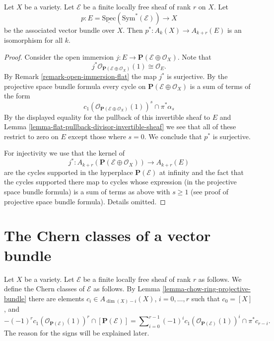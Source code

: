 \begin{lemma}
Let $X$ be a variety.
Let $\mathcal{E}$ be a finite locally free sheaf of rank $r$ on $X$.
Let
$$
p :
E = \underline{\text{Spec}}(\text{Sym}^*(\mathcal{E}))
\longrightarrow
X
$$
be the associated vector bundle over $X$.
Then $p^* : A_k(X) \to A_{k + r}(E)$ is an isomorphism for all $k$.
\end{lemma}

\begin{proof}
Consider the open immersion
$j : E \to \mathbf{P}(\mathcal{E} \oplus \mathcal{O}_X)$.
Note that 
$$
j^*\mathcal{O}_{\mathbf{P}(\mathcal{E} \oplus \mathcal{O}_X)}(1)
\cong \mathcal{O}_E.
$$
By Remark \ref{remark-open-immersion-flat} the map
$j^*$ is surjective. By the projective space bundle formula every
cycle on $\mathbf{P}(\mathcal{E} \oplus \mathcal{O}_X)$ is a
sum of terms of the form 
$$
c_1(\mathcal{O}_{\mathbf{P}(\mathcal{E} \oplus \mathcal{O}_X)}(1))^s
\cap
\pi^*\alpha_s
$$
By the displayed equality for the pullback of this invertible sheaf
to $E$ and Lemma \ref{lemma-flat-pullback-divisor-invertible-sheaf}
we see that all of these restrict to zero on $E$ except those where
$s = 0$. We conclude that $p^*$ is surjective.

\medskip\noindent
For injectivity we use that the kernel of
$$
j^* :
A_{k + r}(\mathbf{P}(\mathcal{E} \oplus \mathcal{O}_X))
\longrightarrow
A_{k + r}(E)
$$
are the cycles supported in the hyperplace $\mathbf{P}(\mathcal{E})$
at infinity and the fact that the cycles supported there map to cycles
whose expression (in the projective space bundle formula) is a sum of
terms as above with $s \geq 1$ (see proof of projective space bundle
formula). Details omitted.
\end{proof}








\section{The Chern classes of a vector bundle}
\label{section-chern-classes-vector-bundles}

\noindent
Let $X$ be a variety. Let $\mathcal{E}$ be a finite locally free sheaf
of rank $r$ as follows. We define the Chern classes of $\mathcal{E}$
as follows. By Lemma \ref{lemma-chow-ring-projective-bundle} there are
elements $c_i \in A_{\dim(X) - i}(X)$, $i=0, \ldots, r$
such that $c_0 = [X]$, and
\begin{equation}
\label{equation-chern-classes}
-(-1)^r c_1(\mathcal{O}_{\mathbf{P}(\mathcal{E})}(1))^r \cap
[\mathbf{P}(\mathcal{E})]
=
\sum\nolimits_{i = 0}^{r - 1}
(-1)^i c_1(\mathcal{O}_{\mathbf{P}(\mathcal{E})}(1))^i \cap \pi^*c_{r - i}.
\end{equation}
The reason for the signs will be explained later.

